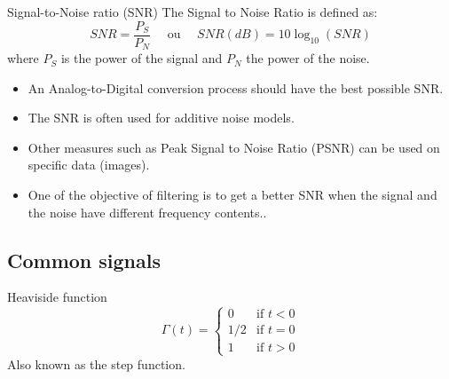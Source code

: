     \begin{block}{Signal-to-Noise ratio (SNR)} 
      The Signal to Noise Ratio is defined as:
  \begin{equation}
    \label{eq:rsb}
    SNR=\frac{P_S}{P_N} \quad \text{ ou } \quad SNR(dB)=10\log_{10}(SNR)
  \end{equation}
  where $P_S$ is the power of the signal and $P_N$ the power of the noise.
  \begin{itemize}
  \item An Analog-to-Digital conversion process should have the best possible SNR.
  \item The SNR is often used for additive noise models.
  \item Other measures such as Peak Signal to Noise Ratio (PSNR) can be used on specific data (images).
  \item One of the objective of filtering is to get a better SNR when the signal and the noise have different frequency contents..
  \end{itemize}
    \end{block}





\subsection{Common signals}
\label{sec:common_sig}


\begin{block}{Heaviside function}
  \begin{equation}
\label{eq:heaviside}
\Gamma(t)=
\begin{cases}
  0& \text{if } t<0\\
  1/2& \text{if } t=0\\
  1 & \text{if } t>0
\end{cases}
\end{equation}
Also known as the step function. 
\end{block}

